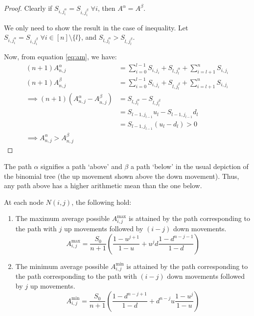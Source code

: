 \begin{proof}
	Clearly if $S_{i,j_i^\alpha} = S_{i,j_i^\beta} \; \forall i$, then $A^\alpha = A^\beta$.
	
	We only need to show the result in the case of inequality.
	Let $ S_{i,j_i^\alpha} = S_{i,j_i^\beta} \; \forall i \in [n] \setminus \{l\} $, and $ S_{l,j_l^\alpha} > S_{l,j_l^\beta}$.
	
	Now, from equation \ref{eq:am}, we have:
	\begin{align*}
	(n+1) A_{n,j}^\alpha &= \sum_{i=0}^{l-1} S_{i,j_i} + S_{l,j_l^\alpha} + \sum_{i=l+1}^{n} S_{i,j_i} \\
	(n+1) A_{n,j}^\beta &= \sum_{i=0}^{l-1} S_{i,j_i} + S_{l,j_l^\beta} + \sum_{i=l+1}^{n} S_{i,j_i} \\
	\implies (n+1) \left(A_{n,j}^\alpha - A_{n,j}^\beta\right) &= S_{l,j_l^\alpha} - S_{l,j_l^\beta} \\
	&= S_{l-1,j_{l-1}} u_l - S_{l-1,j_{l-1}} d_l \\
	&= S_{l-1,j_{l-1}} (u_l - d_l) > 0 \\
	\implies A_{n,j}^\alpha > A_{n,j}^\beta
	\end{align*}
\end{proof}


\begin{rem}
	The path $\alpha$ signifies a path `above' and $\beta$ a path `below' in the usual depiction of the binomial tree (the up movement shown above the down movement). Thus, any path above  has a higher arithmetic mean than the one below.
\end{rem}


\begin{crr}
	\label{crr:up-dn-path}
	At each node $ N(i,j) $, the following hold:
	\begin{enumerate}
		\item The maximum average possible $ A_{i,j}^{\max} $ is attained by the path corresponding to the path with $j$ up movements followed by $(i-j)$ down movements.
		\begin{equation}
		A_{i,j}^{\max} = \frac{S_0}{n+1} \left( \frac{1 - u^{j+1}}{1-u} + u^{j} d \frac{1 - d^{n-j-1}}{1-d} \right)
		\end{equation}
		\item The minimum average possible $ A_{i,j}^{\min} $ is attained by the path corresponding to the path corresponding to the path with $(i-j)$ down movements followed by $j$ up movements.
		\begin{equation}
		A_{i,j}^{\min} = \frac{S_0}{n+1} \left( \frac{1 - d^{n-j+1}}{1-d} + d^{n-j} u \frac{1 - u^{j}}{1-u} \right)
		\end{equation}		
	\end{enumerate}
\end{crr}

